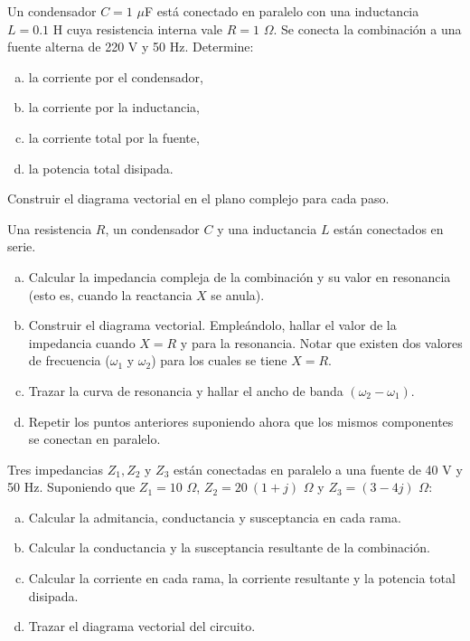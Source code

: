 \documentclass[problemas]{guia}
\begin{document}
 
\maketitle

\begin{problema}{}
    Un condensador $C = 1$ $\mu$F está conectado en paralelo con una 
    inductancia $L = 0.1$ H cuya resistencia interna vale $R = 1$ $\Omega$. 
    Se conecta la combinación a una fuente alterna de 220 V y 50 Hz. Determine:
    \begin{enumerate}[(a)]
        \item la corriente por el condensador,
        \item la corriente por la inductancia,
        \item la corriente total por la fuente,
        \item la potencia total disipada.
\end{enumerate}
    Construir el diagrama vectorial en el plano complejo para cada paso.
\end{problema}

\begin{problema}{}
    Una resistencia $R$, un condensador $C$ y una inductancia $L$ están 
    conectados en serie.
    \begin{enumerate}[(a)]
        \item Calcular la impedancia compleja de la combinación y su valor en 
            resonancia (esto es, cuando la reactancia $X$ se anula).
        \item Construir el diagrama vectorial. Empleándolo, hallar el valor de 
            la impedancia cuando $X = R$ y para la resonancia. Notar que 
            existen dos valores de frecuencia ($\omega_1$ y $\omega_2$) para 
            los cuales se tiene $X = R$.
        \item Trazar la curva de resonancia y hallar el ancho de banda 
            $(\omega_2 - \omega_1)$.
        \item Repetir los puntos anteriores suponiendo ahora que los mismos 
            componentes se conectan en paralelo.
    \end{enumerate}
\end{problema}

\begin{problema}{}
    Tres impedancias $Z_1, Z_2$ y $Z_3$ están conectadas en paralelo a una 
    fuente de 40 V y 50 Hz. Suponiendo que $Z_1 = 10$ $\Omega$, 
    $Z_2 = 20 \: (1+j)$ $\Omega$ y $Z_3 = (3-4j)$ $\Omega$:
    \begin{enumerate}[(a)]
        \item Calcular la admitancia, conductancia y susceptancia en cada rama.
        \item Calcular la conductancia y la susceptancia resultante de la 
            combinación.
        \item Calcular la corriente en cada rama, la corriente resultante y la
            potencia total disipada.
        \item Trazar el diagrama vectorial del circuito.
    \end{enumerate}
\end{problema}
\end{document}
